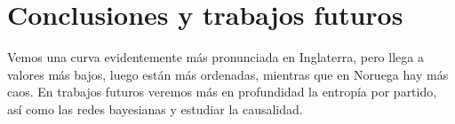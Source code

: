 \chapter{Conclusiones y trabajos futuros}

Vemos una curva evidentemente más pronunciada en Inglaterra, pero llega a valores más bajos, luego están más 
ordenadas, mientras que en Noruega hay más caos. En trabajos futuros veremos más en profundidad la entropía por 
partido, así como las redes bayesianas y estudiar la causalidad.
